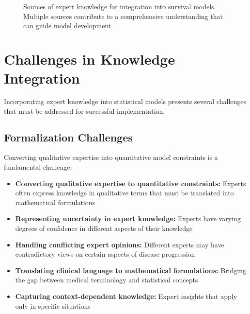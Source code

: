 \begin{figure}[htbp]
    \centering
    \caption{Sources of expert knowledge for integration into survival models. Multiple sources contribute to a comprehensive understanding that can guide model development.}
    \label{fig:expert-knowledge-sources}
\end{figure}

\section{Challenges in Knowledge Integration}

Incorporating expert knowledge into statistical models presents several challenges that must be addressed for successful implementation.

\subsection{Formalization Challenges}

Converting qualitative expertise into quantitative model constraints is a fundamental challenge:

\begin{itemize}
    \item \textbf{Converting qualitative expertise to quantitative constraints:} Experts often express knowledge in qualitative terms that must be translated into mathematical formulations
    \item \textbf{Representing uncertainty in expert knowledge:} Experts have varying degrees of confidence in different aspects of their knowledge
    \item \textbf{Handling conflicting expert opinions:} Different experts may have contradictory views on certain aspects of disease progression
    \item \textbf{Translating clinical language to mathematical formulations:} Bridging the gap between medical terminology and statistical concepts
    \item \textbf{Capturing context-dependent knowledge:} Expert insights that apply only in specific situations
\end{itemize}

